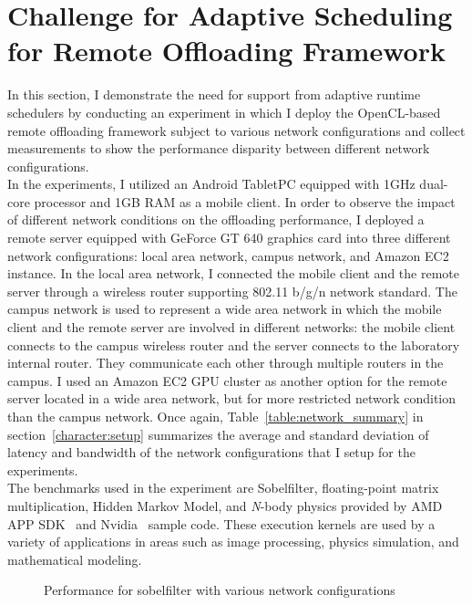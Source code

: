 \section{Challenge for Adaptive Scheduling for Remote Offloading
Framework}
\label{scheduler:challenge}
In this section, I demonstrate the need for support from adaptive
runtime schedulers by conducting an experiment in which I deploy the
OpenCL-based remote offloading framework subject to various network
configurations and collect measurements to show the performance
disparity between different network configurations.\\
%
In the experiments, I utilized an Android TabletPC equipped with
1GHz dual-core processor and 1GB RAM as a mobile client.
%
In order to observe the impact of different network
conditions on the offloading performance, I deployed a remote server
equipped with GeForce GT 640 graphics card into three different network
configurations: local area network, campus network, and Amazon EC2
instance.
%
In the local area network, I connected the mobile client and the remote
server through a wireless router supporting 802.11 b/g/n network
standard.
%
The campus network is used to represent a wide area network in which
the mobile client and the remote server are involved in different
networks: the mobile client connects to the campus wireless router and
the server connects to the laboratory internal router.
%
They communicate each other through multiple routers in the campus.
%
I used an Amazon EC2 GPU cluster as another option for the remote
server located in a wide area network, but for more restricted network
condition than the campus network.
%
Once again, Table~\ref{table:network_summary} in
section~\ref{character:setup} summarizes the average and standard deviation of latency
and bandwidth of the network configurations that I setup for the
experiments.\\
%
The benchmarks used in the experiment are Sobelfilter, floating-point
matrix multiplication, Hidden Markov Model, and \textit{N}-body physics
provided by AMD APP SDK~\cite{amd} and Nvidia~\cite{nvidia} sample code.
%
These execution kernels are used by a variety of applications in areas such as image
processing, physics simulation, and mathematical modeling.\\
%
\begin{figure}
\centering
{}
\caption{Performance for sobelfilter with various network
configurations}
\label{fig:challenge_network}
\end{figure}
